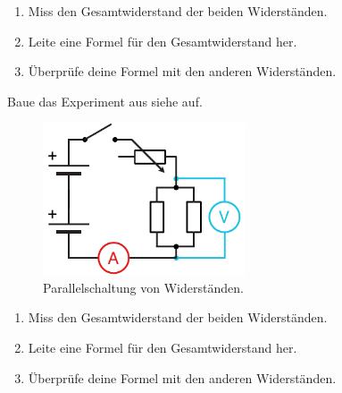 \begin{enumerate}
    \item Miss den Gesamtwiderstand der beiden Widerständen.
    \item Leite eine Formel für den Gesamtwiderstand her.
    \item Überprüfe deine Formel mit den anderen Widerständen.
\end{enumerate}





\newpage
{}

Baue das Experiment aus siehe  auf.

\begin{figure}[h!]
    \centering
    \includegraphics[width=6cm]{_images/ohm_widerstand_parallel.pdf}
    \caption{Parallelschaltung von Widerständen.}
    \label{fig:ohm_resistors_parallel}
\end{figure}

\begin{enumerate}
    \item Miss den Gesamtwiderstand der beiden Widerständen.
    \item Leite eine Formel für den Gesamtwiderstand her.
    \item Überprüfe deine Formel mit den anderen Widerständen.
\end{enumerate}


